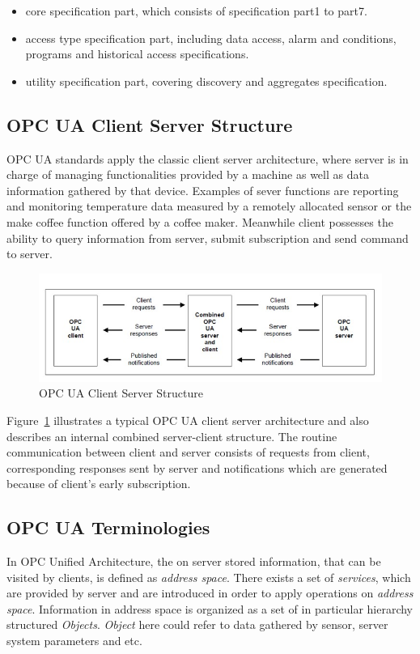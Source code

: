 \begin{itemize}
\item core specification part, which consists of specification part1 to part7.
\item access type specification part, including data access, alarm and conditions, programs and historical access specifications.
\item utility specification part, covering discovery and aggregates specification.
\end{itemize}


\subsection{OPC UA Client Server Structure}
OPC UA standards apply the classic client server architecture, where server is in charge of managing functionalities provided by a machine as well as data information gathered by that device. Examples of sever functions are reporting and monitoring temperature data measured by a remotely allocated sensor or the make coffee function offered by a coffee maker. Meanwhile client possesses the ability to query information from server, submit subscription and send command to server.

\begin{figure}[!htbp]
	\centering
	\includegraphics[width=1.00\textwidth]{cs.jpg}
		\caption{OPC UA Client Server Structure\cite{O1}}
	\label{fig:cs}
\end{figure}
Figure~\ref{fig:cs} illustrates a typical OPC UA client server architecture and also describes an internal combined server-client structure. The routine communication between client and server consists of requests from client, corresponding responses sent by server and notifications which are generated because of client's early subscription.

\subsection{OPC UA Terminologies}
In OPC Unified Architecture, the on server stored information, that can be visited by clients, is defined as \emph{address space}\cite{O3}. There exists a set of \emph{services}\cite{O4}, which are provided by server and are introduced in order to apply operations on \emph{address space}. Information in address space is organized as a set of in particular hierarchy structured \emph{Objects}. \emph{Object} here could refer to data gathered by sensor, server system parameters and etc. 

